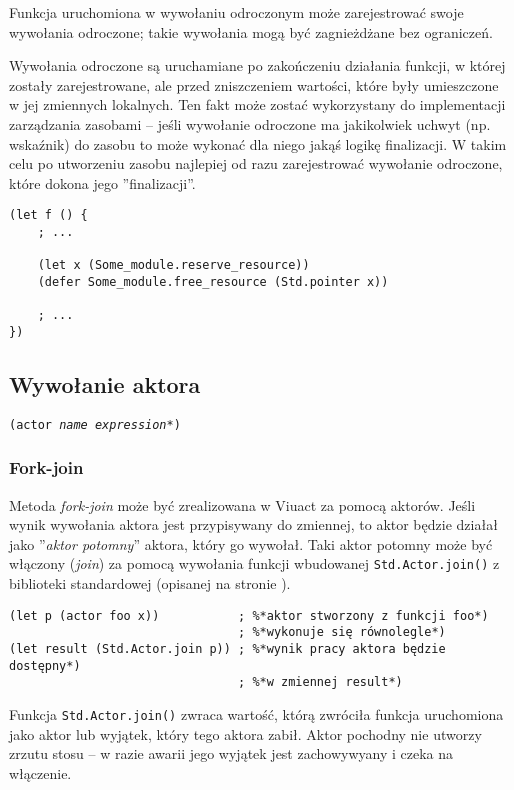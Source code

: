 \documentclass[11pt,oneside,a4paper,titlepage,onecolumn]{article}
\begin{document}
Funkcja uruchomiona w wywołaniu odroczonym może zarejestrować swoje wywołania odroczone; takie wywołania
mogą być zagnieżdżane bez ograniczeń.

Wywołania odroczone są uruchamiane po zakończeniu działania funkcji, w której zostały zarejestrowane, ale
przed zniszczeniem wartości, które były umieszczone w jej zmiennych lokalnych. Ten fakt może zostać
wykorzystany do implementacji zarządzania zasobami -- jeśli wywołanie odroczone ma jakikolwiek uchwyt (np.
wskaźnik) do zasobu to może wykonać dla niego jakąś logikę finalizacji. W takim celu po utworzeniu zasobu
najlepiej od razu zarejestrować wywołanie odroczone, które dokona jego ''finalizacji''.

\begin{lstlisting}
(let f () {
    ; ...

    (let x (Some_module.reserve_resource))
    (defer Some_module.free_resource (Std.pointer x))

    ; ...
})
\end{lstlisting}

\subsection{Wywołanie aktora}

\texttt{(actor \emph{name} \emph{expression}*)}

\subsubsection{Fork-join}

Metoda \emph{fork-join} może być zrealizowana w Viuact za pomocą aktorów. Jeśli wynik wywołania aktora jest
przypisywany do zmiennej, to aktor będzie działał jako ''\emph{aktor potomny}'' aktora, który go wywołał. Taki
aktor potomny może być włączony (\emph{join}) za pomocą wywołania funkcji wbudowanej \texttt{Std.Actor.join()}
z biblioteki standardowej (opisanej na stronie \pageref{Std_Actor_join}).

\begin{lstlisting}
(let p (actor foo x))           ; %*aktor stworzony z funkcji foo*)
                                ; %*wykonuje się równolegle*)
(let result (Std.Actor.join p)) ; %*wynik pracy aktora będzie dostępny*)
                                ; %*w zmiennej result*)
\end{lstlisting}

Funkcja \texttt{Std.Actor.join()} zwraca wartość, którą zwróciła funkcja uruchomiona jako aktor lub wyjątek,
który tego aktora zabił. Aktor pochodny nie utworzy zrzutu stosu -- w razie awarii jego wyjątek jest
zachowywyany i czeka na włączenie.
\end{document}
